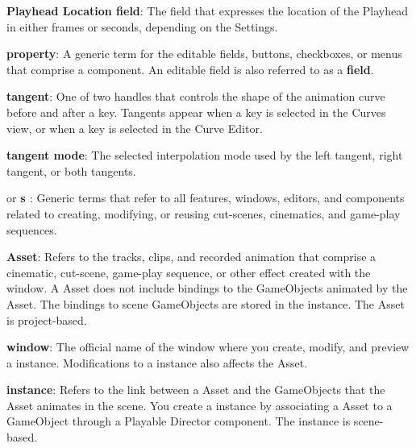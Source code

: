 {\bfseries{Playhead Location field}}\+: The field that expresses the location of the  Playhead in either frames or seconds, depending on the  Settings.

{\bfseries{property}}\+: A generic term for the editable fields, buttons, checkboxes, or menus that comprise a component. An editable field is also referred to as a {\bfseries{field}}.

{\bfseries{tangent}}\+: One of two handles that controls the shape of the animation curve before and after a key. Tangents appear when a key is selected in the Curves view, or when a key is selected in the Curve Editor.

{\bfseries{tangent mode}}\+: The selected interpolation mode used by the left tangent, right tangent, or both tangents.

{\bfseries{}} or {\bfseries{\textquotesingle{}s }}\+: Generic terms that refer to all features, windows, editors, and components related to creating, modifying, or reusing cut-\/scenes, cinematics, and game-\/play sequences.

{\bfseries{ Asset}}\+: Refers to the tracks, clips, and recorded animation that comprise a cinematic, cut-\/scene, game-\/play sequence, or other effect created with the  window. A  Asset does not include bindings to the Game\+Objects animated by the  Asset. The bindings to scene Game\+Objects are stored in the  instance. The  Asset is project-\/based.

{\bfseries{ window}}\+: The official name of the window where you create, modify, and preview a  instance. Modifications to a  instance also affects the  Asset.

{\bfseries{ instance}}\+: Refers to the link between a  Asset and the Game\+Objects that the  Asset animates in the scene. You create a  instance by associating a  Asset to a Game\+Object through a Playable Director component. The  instance is scene-\/based.

